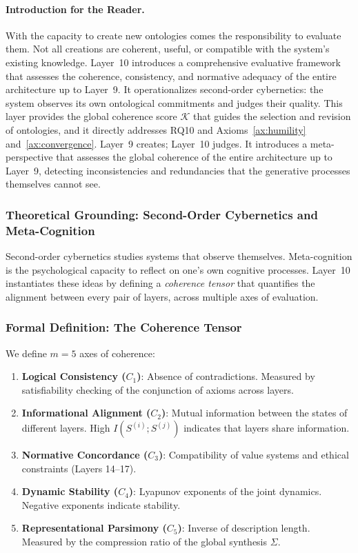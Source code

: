 \paragraph{Introduction for the Reader.}
With the capacity to create new ontologies comes the responsibility to evaluate them. Not all creations are coherent, useful, or compatible with the system's existing knowledge. Layer~10 introduces a comprehensive evaluative framework that assesses the coherence, consistency, and normative adequacy of the entire architecture up to Layer~9. It operationalizes second-order cybernetics: the system observes its own ontological commitments and judges their quality. This layer provides the global coherence score $\mathcal{K}$ that guides the selection and revision of ontologies, and it directly addresses RQ10 and Axioms~\ref{ax:humility} and~\ref{ax:convergence}.
Layer~9 creates; Layer~10 judges. It introduces a meta-perspective that assesses the global coherence of the entire architecture up to Layer~9, detecting inconsistencies and redundancies that the generative processes themselves cannot see.

\subsubsection{Theoretical Grounding: Second-Order Cybernetics and Meta-Cognition}
Second-order cybernetics \cite{vonfoerster1981} studies systems that observe themselves. Meta-cognition \cite{flavell1979} is the psychological capacity to reflect on one's own cognitive processes. Layer~10 instantiates these ideas by defining a \emph{coherence tensor} that quantifies the alignment between every pair of layers, across multiple axes of evaluation.

\subsubsection{Formal Definition: The Coherence Tensor}
\begin{definition}
We define $m = 5$ axes of coherence:
\begin{enumerate}
    \item \textbf{Logical Consistency ($C_1$)}: Absence of contradictions. Measured by satisfiability checking of the conjunction of axioms across layers.
    \item \textbf{Informational Alignment ($C_2$)}: Mutual information between the states of different layers. High $I(S^{(i)}; S^{(j)})$ indicates that layers share information.
    \item \textbf{Normative Concordance ($C_3$)}: Compatibility of value systems and ethical constraints (Layers 14--17).
    \item \textbf{Dynamic Stability ($C_4$)}: Lyapunov exponents of the joint dynamics. Negative exponents indicate stability.
    \item \textbf{Representational Parsimony ($C_5$)}: Inverse of description length. Measured by the compression ratio of the global synthesis $\Sigma$.
\end{enumerate}
\end{definition}

